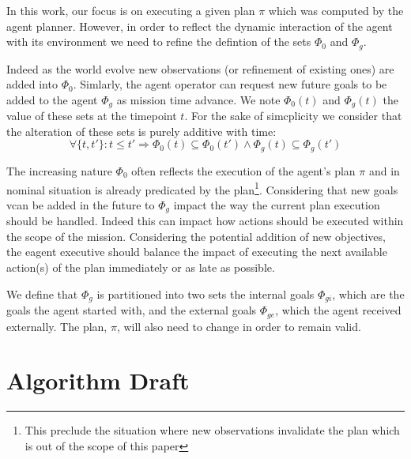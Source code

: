  
In this work, our focus is on executing a given plan $\pi$ which was
computed by the agent planner. However, in order to reflect the
dynamic interaction of the agent with its environment we need to
refine the defintion of the sets $\Phi_0$ and $\Phi_g$. 

Indeed as the world evolve new observations (or refinement of
existing ones) are added into $\Phi_0$. Simlarly, the agent operator
can request new future goals to be added to the agent $\Phi_g$ as
mission time advance. We note $\Phi_0(t)$ and $\Phi_g(t)$ the value 
of these sets at the timepoint $t$. For the sake of simcplicity we
 consider that the alteration of these sets is purely additive with
 time:
\[ \forall \{t, t'\}: t \le t' \Rightarrow \Phi_0(t) \subseteq \Phi_0(t')
\wedge \Phi_g(t) \subseteq \Phi_g(t') \] 

The increasing nature $\Phi_0$ often reflects the execution of
the agent's plan $\pi$ and in nominal situation is already predicated
by the plan\footnote{This preclude the situation where new
  observations invalidate the plan which is out of the scope 
of this paper}. Considering that new goals vcan be added in the future
to $\Phi_g$ impact the way the current plan execution should be
handled. Indeed this can impact how actions should be executed within
the scope of the mission. Considering the potential addition of new
objectives, the eagent executive should balance the impact of
executing the next available action(s) of the plan immediately or as
late as possible. 

We define that $\Phi_g$ is partitioned into two sets the internal goals $\Phi_{gi}$, 
 which are the goals the agent started with, and the external goals $\Phi_{ge}$, which 
 the agent received externally. The plan, $\pi$, will also need to change in order to remain valid.


\section{Algorithm Draft}


